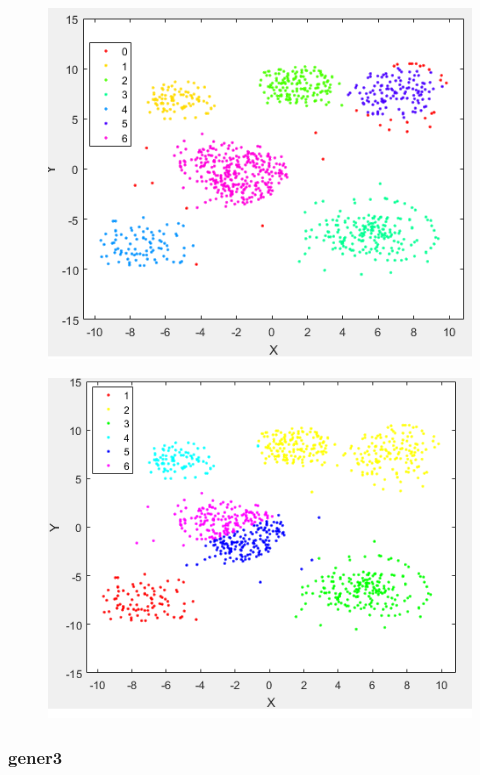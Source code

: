 \documentclass[a4paper,10pt,table]{article}
\begin{document}
\begin{figure}[h]
\centering
\begin{minipage}{.5\textwidth}
  \centering
  \includegraphics[width=.9\linewidth]{generex.png}
  \label{fig:test1}
\end{minipage}%
\begin{minipage}{.5\textwidth}
  \centering
  \includegraphics[width=.9\linewidth]{generkm.png}
  \label{fig:test2}
\end{minipage}
\end{figure}
\newpage
\subsubsection{gener3}
\end{document}
